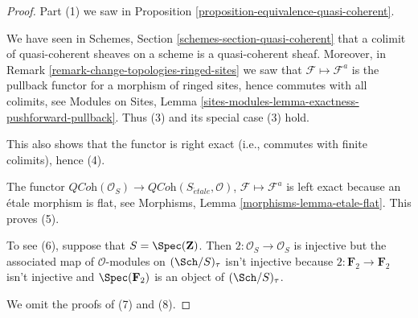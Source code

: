 \begin{proof}
Part (1) we saw in
Proposition \ref{proposition-equivalence-quasi-coherent}.

\medskip\noindent
We have seen in
Schemes, Section \ref{schemes-section-quasi-coherent}
that a colimit of quasi-coherent sheaves on a scheme is a quasi-coherent
sheaf. Moreover, in
Remark \ref{remark-change-topologies-ringed-sites}
we saw that $\mathcal{F} \mapsto \mathcal{F}^a$ is the pullback functor
for a morphism of ringed sites, hence commutes with all colimits, see
Modules on Sites, Lemma
\ref{sites-modules-lemma-exactness-pushforward-pullback}.
Thus (3) and its special case (3) hold.

\medskip\noindent
This also shows that the functor is right exact (i.e., commutes with
finite colimits), hence (4).

\medskip\noindent
The functor $\textit{QCoh}(\mathcal{O}_S) \to
\textit{QCoh}(S_{\acute{e}tale}, \mathcal{O})$,
$\mathcal{F} \mapsto \mathcal{F}^a$
is left exact because an \'etale morphism is flat, see
Morphisms, Lemma \ref{morphisms-lemma-etale-flat}.
This proves (5).

\medskip\noindent
To see (6), suppose that $S = \Spec(\mathbf{Z})$.
Then $2 : \mathcal{O}_S \to \mathcal{O}_S$ is injective but the associated
map of $\mathcal{O}$-modules on $(\Sch/S)_\tau$ isn't
injective because $2 : \mathbf{F}_2 \to \mathbf{F}_2$ isn't injective
and $\Spec(\mathbf{F}_2)$ is an object of $(\Sch/S)_\tau$.

\medskip\noindent
We omit the proofs of (7) and (8).


\end{proof}
